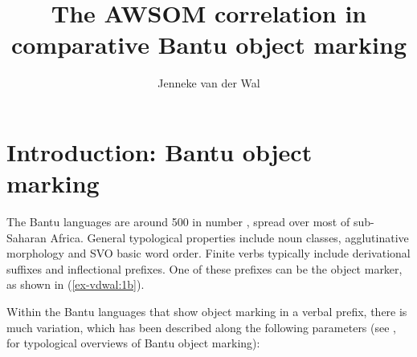 \documentclass[output=paper
,modfonts
,nonflat]{langsci/langscibook}
\title{The AWSOM correlation in comparative Bantu object marking}
\author{Jenneke {van der Wal}\affiliation{Leiden University Centre for Linguistics}}
\begin{document}
	
\maketitle	
\section{Introduction: Bantu object marking} \label{sec-vdwal:1}


The Bantu languages are around 500 in number \citep[1]{Nurse_Philippson2003}, spread over most of sub-Saharan Africa. General typological properties include noun classes, agglutinative morphology and SVO basic word order. Finite verbs typically include derivational suffixes and inflectional prefixes. One of these prefixes can be the object marker, as shown in (\ref{ex-vdwal:1b}).

\noindent Within the Bantu languages that show object marking in a verbal prefix, there is much variation, which has been described along the following parameters (see \citealt{Hyman_Duranti1982,Polak1986,Morimoto2002,Beaudoin-Lietz_et_al2004,Marten_et_al2007,Riedel2009,Marten_Kula2012,Zeller2014,Marlo2015}, for typological overviews of Bantu object marking):
\end{document}
